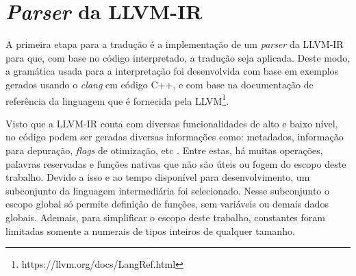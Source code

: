 \section{\emph{Parser} da LLVM-IR}

A primeira etapa para a tradução é a implementação de um \emph{parser} da LLVM-IR para que, com base no código interpretado, a tradução seja aplicada. Deste modo, a gramática usada para a interpretação foi desenvolvida com base em exemplos gerados usando o \emph{clang} em código C++, e com base na documentação de referência da linguagem que é fornecida pela LLVM\footnote{https://llvm.org/docs/LangRef.html}.

Visto que a LLVM-IR conta com diversas funcionalidades de alto e baixo nível, no código podem ser geradas diversas informações como: metadados, informação para depuração, \emph{flags} de otimização, etc \cite{llvmLangRef}. Entre estas, há muitas operações, palavras reservadas e funções nativas que não são úteis ou fogem do escopo deste trabalho. Devido a isso e ao tempo disponível para desenvolvimento, um subconjunto da linguagem intermediária foi selecionado. Nesse subconjunto o escopo global só permite definição de funções, sem variáveis ou demais dados globais. Ademais, para simplificar o escopo deste trabalho, constantes foram limitadas somente a numerais de tipos inteiros de qualquer tamanho.

